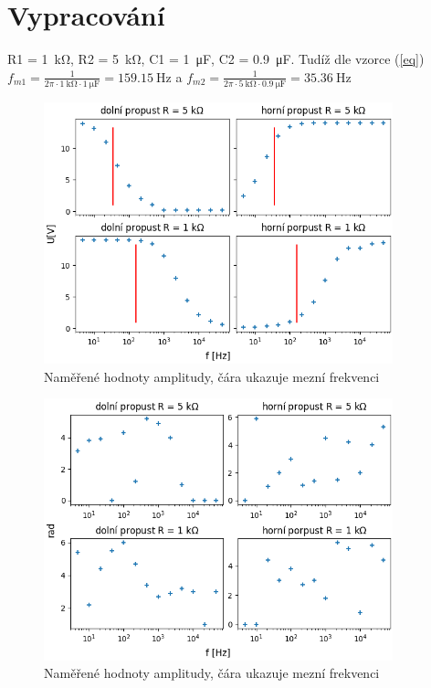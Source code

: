 \documentclass[12pt,a4paper]{article}
\begin{document}
\section*{Vypracování}
	R1 = \SI{1}{\kilo\ohm},
	R2 = \SI{5}{\kilo\ohm},
	C1 = \SI{1}{\micro\farad},
	C2 = \SI{0.9}{\micro\farad}.
Tudíž dle vzorce (\ref{eq}) $f_{m1} = \frac{1}{2\pi\cdot \SI{1}{\kilo\ohm}\cdot \SI{1}{\micro\farad}} = \SI{159.15}{\hertz}$ a $f_{m2} = \frac{1}{2\pi\cdot \SI{5}{\kilo\ohm}\cdot \SI{0.9}{\micro\farad}} = \SI{35.36}{\hertz}$
\begin{figure}[H]
	\centering
	\includegraphics[width=0.9\textwidth]{fancy3.png}
	\caption{Naměřené hodnoty amplitudy, čára ukazuje mezní frekvenci}
\end{figure}
\begin{figure}[H]
	\centering
	\includegraphics[width=0.9\textwidth]{../../propust/lol1.png}
	\caption{Naměřené hodnoty amplitudy, čára ukazuje mezní frekvenci}
\end{figure}
\end{document}
